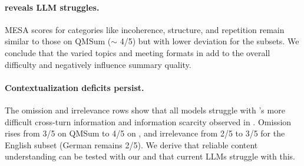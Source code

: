 \paragraph{\dataset{} reveals LLM struggles.} 
MESA scores for categories like incoherence, structure, and repetition remain similar to those on QMSum ($\sim$ 4/5) but with lower deviation for the \dataset{} subsets.
We conclude that the varied topics and meeting formats in \dataset{} add to the overall difficulty and negatively influence summary quality.


\paragraph{Contextualization deficits persist.}
The omission and irrelevance rows show that all models struggle with \dataset{}'s more difficult cross-turn information and information scarcity observed in .
Omission rises from 3/5 on QMSum to 4/5 on \dataset{}, and irrelevance from 2/5 to 3/5 for the English subset (German remains 2/5).
We derive that reliable content understanding \cite{KirsteinRKG24a,KirsteinLG25a} can be tested with our \dataset{} and that current LLMs struggle with this.
